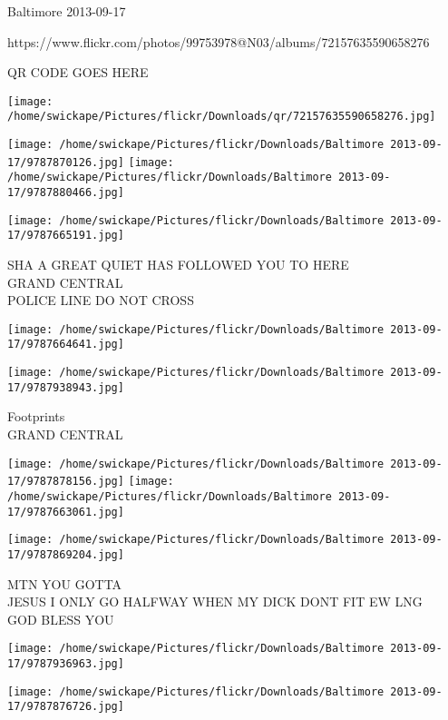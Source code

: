 \documentclass[10pt,letterpaper]{article}
\begin{document}
Baltimore 2013-09-17

https://www.flickr.com/photos/99753978@N03/albums/72157635590658276

QR CODE GOES HERE

\texttt{[image: /home/swickape/Pictures/flickr/Downloads/qr/72157635590658276.jpg]}
\pagebreak

\texttt{[image: /home/swickape/Pictures/flickr/Downloads/Baltimore 2013-09-17/9787870126.jpg]}
\texttt{[image: /home/swickape/Pictures/flickr/Downloads/Baltimore 2013-09-17/9787880466.jpg]}

\vspace{0.25in}
\texttt{[image: /home/swickape/Pictures/flickr/Downloads/Baltimore 2013-09-17/9787665191.jpg]}

SHA A GREAT QUIET HAS FOLLOWED YOU TO HERE\\
GRAND CENTRAL\\
POLICE LINE DO NOT CROSS\\
\pagebreak

\texttt{[image: /home/swickape/Pictures/flickr/Downloads/Baltimore 2013-09-17/9787664641.jpg]}

\vspace{0.25in}
\texttt{[image: /home/swickape/Pictures/flickr/Downloads/Baltimore 2013-09-17/9787938943.jpg]}

Footprints\\
GRAND CENTRAL\\
\pagebreak

\texttt{[image: /home/swickape/Pictures/flickr/Downloads/Baltimore 2013-09-17/9787878156.jpg]}
\texttt{[image: /home/swickape/Pictures/flickr/Downloads/Baltimore 2013-09-17/9787663061.jpg]}

\vspace{0.25in}
\texttt{[image: /home/swickape/Pictures/flickr/Downloads/Baltimore 2013-09-17/9787869204.jpg]}

MTN YOU GOTTA\\
JESUS I ONLY GO HALFWAY WHEN MY DICK DONT FIT EW LNG\\
GOD BLESS YOU\\
\pagebreak

\texttt{[image: /home/swickape/Pictures/flickr/Downloads/Baltimore 2013-09-17/9787936963.jpg]}

\vspace{0.25in}
\texttt{[image: /home/swickape/Pictures/flickr/Downloads/Baltimore 2013-09-17/9787876726.jpg]}
\end{document}
